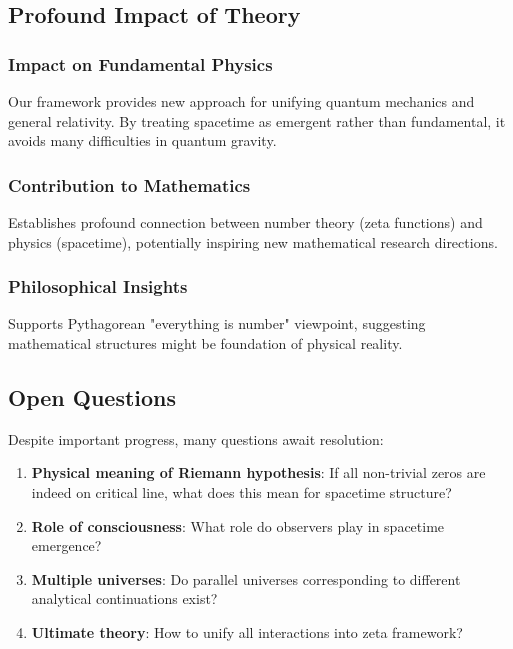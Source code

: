 \documentclass[12pt,a4paper]{article}
\begin{document}
\subsection{Profound Impact of Theory}

\subsubsection{Impact on Fundamental Physics}

Our framework provides new approach for unifying quantum mechanics and general relativity. By treating spacetime as emergent rather than fundamental, it avoids many difficulties in quantum gravity.

\subsubsection{Contribution to Mathematics}

Establishes profound connection between number theory (zeta functions) and physics (spacetime), potentially inspiring new mathematical research directions.

\subsubsection{Philosophical Insights}

Supports Pythagorean "everything is number" viewpoint, suggesting mathematical structures might be foundation of physical reality.

\subsection{Open Questions}

Despite important progress, many questions await resolution:

\begin{enumerate}
\item \textbf{Physical meaning of Riemann hypothesis}: If all non-trivial zeros are indeed on critical line, what does this mean for spacetime structure?

\item \textbf{Role of consciousness}: What role do observers play in spacetime emergence?

\item \textbf{Multiple universes}: Do parallel universes corresponding to different analytical continuations exist?

\item \textbf{Ultimate theory}: How to unify all interactions into zeta framework?
\end{enumerate}
\end{document}
